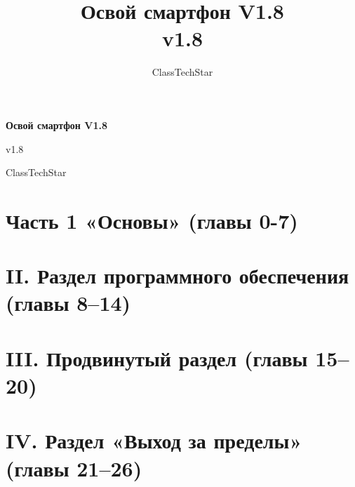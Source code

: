 \documentclass[11pt,a4paper,openany]{book}
\title{Освой смартфон V1.8\\ \large v1.8}
\author{ClassTechStar}
\date{}
\begin{document}
\begin{titlepage}
\centering
\vspace*{0.28\textheight}
{\Huge\bfseries Освой смартфон V1.8\par}
\vspace{1.2em}
{\Large v1.8\par}
\vfill
{\large ClassTechStar\par}
\end{titlepage}
\frontmatter
\tableofcontents
\mainmatter
\part*{Часть 1 «Основы» (главы 0-7)}










\part*{II. Раздел программного обеспечения (главы 8–14)}








\part*{III. Продвинутый раздел (главы 15–20)}







\part*{IV. Раздел «Выход за пределы» (главы 21–26)}







\end{document}
